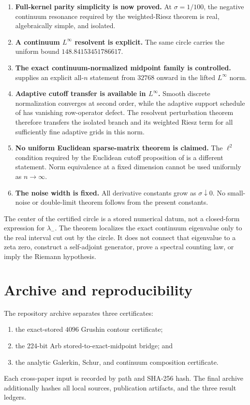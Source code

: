\documentclass[11pt]{article}
\theoremstyle{definition}
\theoremstyle{remark}
\begin{document}
\begin{enumerate}[leftmargin=2em]
 \item \textbf{Full-kernel parity simplicity is now proved.}
       At $\sigma=1/100$, the negative continuum resonance required by the
       weighted-Riesz theorem is real, algebraically simple, and isolated.
 \item \textbf{A continuum $L^\infty$ resolvent is explicit.}
       The same circle carries the uniform bound
       $148.84153451786617$.
 \item \textbf{The exact continuum-normalized midpoint family is controlled.}
        supplies an explicit all-$n$ statement from
       $32768$ onward in the lifted $L^\infty$ norm.
 \item \textbf{Adaptive cutoff transfer is available in $L^\infty$.}
       Smooth discrete normalization converges at second order, while the
       adaptive support schedule of \citet{WangCutoff2026} has vanishing
       row-operator defect.  The resolvent perturbation theorem therefore
       transfers the isolated branch and its weighted Riesz term for all
       sufficiently fine adaptive grids in this norm.
 \item \textbf{No uniform Euclidean sparse-matrix theorem is claimed.}
       The $\ell^2$ condition required by the Euclidean cutoff proposition
       of \citet{WangRiesz2026} is a different statement.  Norm equivalence
       at a fixed dimension cannot be used uniformly as $n\to\infty$.
 \item \textbf{The noise width is fixed.}
       All derivative constants grow as $\sigma\downarrow0$.  No small-noise
       or double-limit theorem follows from the present constants.
\end{enumerate}

The center of the certified circle is a stored numerical datum, not a
closed-form expression for $\lambda_-$.  The theorem localizes the exact
continuum eigenvalue only to the real interval cut out by the circle.  It
does not connect that eigenvalue to a zeta zero, construct a self-adjoint
generator, prove a spectral counting law, or imply the Riemann hypothesis.

\section{Archive and reproducibility}
\label{sec:archive}

The repository archive separates three certificates:
\begin{enumerate}[leftmargin=2em]
 \item the exact-stored $4096$ Grushin contour certificate;
 \item the 224-bit Arb stored-to-exact-midpoint bridge; and
 \item the analytic Galerkin, Schur, and continuum composition certificate.
\end{enumerate}
Each cross-paper input is recorded by path and SHA-256 hash.  The final
archive additionally hashes all local sources, publication artifacts, and
the three result ledgers.
\end{document}
